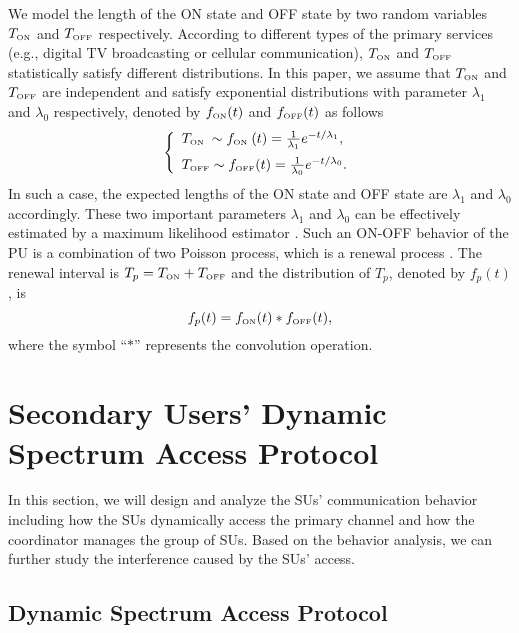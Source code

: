 \documentclass[11pt,draftcls]{IEEEtran}{\onecolumn}
\begin{document}
We model the length of the ON state and OFF state by two random
variables $T_{\mbox{\tiny{ON}}}$ and $T_{\mbox{\tiny{OFF}}}$
respectively. According to different types of the primary services
(e.g., digital TV broadcasting or cellular communication),
$T_{\mbox{\tiny{ON}}}$ and $T_{\mbox{\tiny{OFF}}}$ statistically
satisfy different distributions. In this paper, we assume that
$T_{\mbox{\tiny{ON}}}$ and $T_{\mbox{\tiny{OFF}}}$ are independent
and satisfy exponential distributions with parameter $\lambda_1$ and
$\lambda_0$ respectively, denoted by $f_{\mbox{\tiny{ON}}}(t)$ and
$f_{\mbox{\tiny{OFF}}}(t)$ as follows
\begin{equation}\label{distri}
\left\{ \begin{array}{l}
T_{\mbox{\tiny{ON} }}\sim
f_{\mbox{\tiny{ON }}}(t)=
\frac{1}{\lambda_1} e^{-t/\lambda_1}, \vspace{2mm}\\
T_{\mbox{\tiny{OFF}}}\sim
f_{\mbox{\tiny{OFF}}}(t)=
\frac{1}{\lambda_0} e^{-t/\lambda_0}.
\end{array}\right.
\end{equation}
In such a case, the expected lengths of the ON state and OFF state are
$\lambda_1$ and $\lambda_0$ accordingly. These two important
parameters $\lambda_1$ and $\lambda_0$ can be effectively estimated
by a maximum likelihood estimator \cite{12}. Such an ON-OFF behavior
of the PU is a combination of two Poisson process, which is a
renewal process \cite{renew}. The renewal interval is
$T_p=T_{\mbox{\tiny{ON}}}+T_{\mbox{\tiny{OFF}}}$ and the distribution of $T_p$,
denoted by $f_p(t)$, is
\begin{equation}\label{fp}
f_p(t)=f_{\mbox{\tiny{ON}}}(t) \ast f_{\mbox{\tiny{OFF}}}(t),
\end{equation}
where the symbol ``$\ast$'' represents the convolution operation.

\section{Secondary Users' Dynamic Spectrum Access Protocol}\label{cases}

In this section, we will design and analyze the SUs' communication
behavior including how the SUs dynamically access the primary
channel and how the coordinator manages the group of SUs. Based on
the behavior analysis, we can further study the interference caused
by the SUs' access.

\subsection{Dynamic Spectrum Access Protocol}
\end{document}
